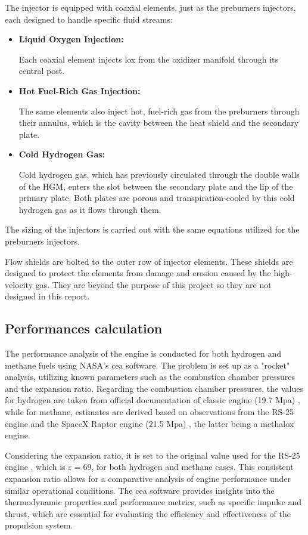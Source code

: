The injector is equipped with coaxial elements, just as the preburners injectors, each designed to handle specific fluid streams:

\begin{itemize}
    \item \textbf{Liquid Oxygen Injection:} 
    
    Each coaxial element injects \acrlong{lox} from the oxidizer manifold through its central post.
    \item \textbf{Hot Fuel-Rich Gas Injection:}
    
    The same elements also inject hot, fuel-rich gas from the preburners through their annulus, which is the cavity between the heat shield and the secondary plate.
    \item \textbf{Cold Hydrogen Gas:}
    
    Cold hydrogen gas, which has previously circulated through the double walls of the \acrshort{HGM}, enters the slot between the secondary plate and the lip of the primary plate. Both plates are porous and transpiration-cooled by this cold hydrogen gas as it flows through them.
\end{itemize}

The sizing of the injectors is carried out with the same equations utilized for the preburners injectors.

Flow shields are bolted to the outer row of injector elements.
These shields are designed to protect the elements from damage and erosion caused by the high-velocity gas. 
They are beyond the purpose of this project so they are not designed in this report.


\subsection{Performances calculation} \label{sec:perf}
The performance analysis of the engine is conducted for both hydrogen and methane fuels using NASA's \acrfull{cea} software. 
The problem is set up as a "rocket" analysis, utilizing known parameters such as the combustion chamber pressures and the expansion ratio. 
Regarding the combustion chamber pressures, the values for hydrogen are taken from official documentation of classic engine (19.7 Mpa) \cite{presentation}, while for methane, estimates are derived based on observations from the RS-25 engine and the SpaceX Raptor engine (21.5 Mpa) , the latter being a methalox engine.

Considering the expansion ratio, it is set to the original value used for the RS-25 engine \cite{data_sheet}, which is \(\varepsilon = 69\), for both hydrogen and methane cases.
This consistent expansion ratio allows for a comparative analysis of engine performance under similar operational conditions. 
The \acrshort{cea} software provides insights into the thermodynamic properties and performance metrics, such as specific impulse and thrust, which are essential for evaluating the efficiency and effectiveness of the propulsion system.

